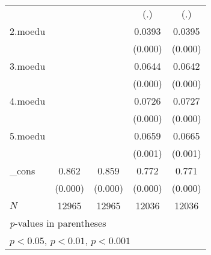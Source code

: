 {\begin{tabular}{l*{4}{c}}
            &                     &                     &         (.)         &         (.)         \\
[1em]
2.moedu     &                     &                     &      0.0393\sym{***}&      0.0395\sym{***}\\
            &                     &                     &     (0.000)         &     (0.000)         \\
[1em]
3.moedu     &                     &                     &      0.0644\sym{***}&      0.0642\sym{***}\\
            &                     &                     &     (0.000)         &     (0.000)         \\
[1em]
4.moedu     &                     &                     &      0.0726\sym{***}&      0.0727\sym{***}\\
            &                     &                     &     (0.000)         &     (0.000)         \\
[1em]
5.moedu     &                     &                     &      0.0659\sym{***}&      0.0665\sym{***}\\
            &                     &                     &     (0.001)         &     (0.001)         \\
[1em]
\_cons      &       0.862\sym{***}&       0.859\sym{***}&       0.772\sym{***}&       0.771\sym{***}\\
            &     (0.000)         &     (0.000)         &     (0.000)         &     (0.000)         \\
\hline
\(N\)       &       12965         &       12965         &       12036         &       12036         \\
\hline\hline
\multicolumn{5}{l}{\footnotesize \textit{p}-values in parentheses}\\
\multicolumn{5}{l}{\footnotesize \sym{*} \(p<0.05\), \sym{**} \(p<0.01\), \sym{***} \(p<0.001\)}\\
\end{tabular}
}
